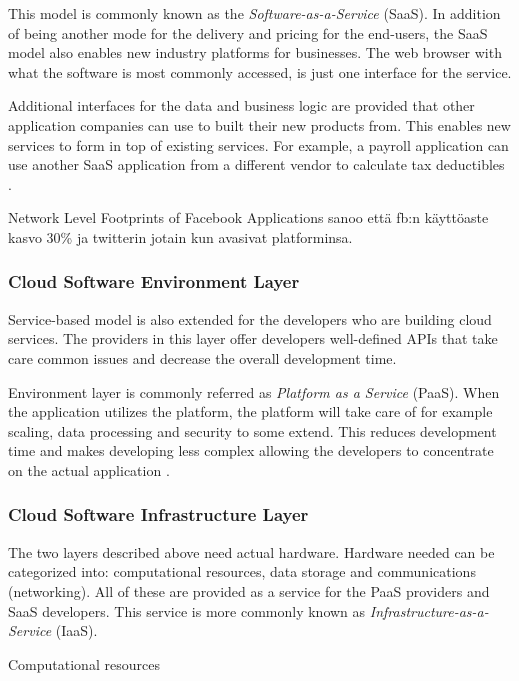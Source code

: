 \documentclass{tktltiki}
\begin{document}
This model is commonly known as the \emph{Software-as-a-Service} (SaaS).  In addition of being another mode for the delivery and pricing for the end-users, the SaaS model also enables new industry platforms for businesses.  The web browser with what the software is most commonly accessed, is just one interface for the service.  

Additional interfaces for the data and business logic are provided that other application companies can use to built their new products from.  This enables new services to form in top of existing services.  For example, a payroll application can use another SaaS application from a different vendor to calculate tax deductibles \cite{Cusumano10, unified_ontology}.

Network Level Footprints of Facebook Applications sanoo että fb:n käyttöaste kasvo 30\% ja twitterin jotain kun avasivat platforminsa.



\subsubsection{Cloud Software Environment Layer}


Service-based model is also extended for the developers who are building cloud services.  The providers in this layer offer developers well-defined APIs that take care common issues and decrease the overall development time.

Environment layer is commonly referred as \emph{Platform as a Service} (PaaS).  When the application utilizes the platform, the platform will take care of for example scaling, data processing and security to some extend.  This reduces development time and makes developing less complex allowing the developers to concentrate on the actual application \cite{unified_ontology}.


\subsubsection{Cloud Software Infrastructure Layer}


The two layers described above need actual hardware. Hardware needed can be categorized into: computational resources, data storage and communications (networking).  All of these are provided as a service for the PaaS providers and SaaS developers.  This service is more commonly known as \emph{Infrastructure-as-a-Service} (IaaS).

Computational resources
\end{document}
